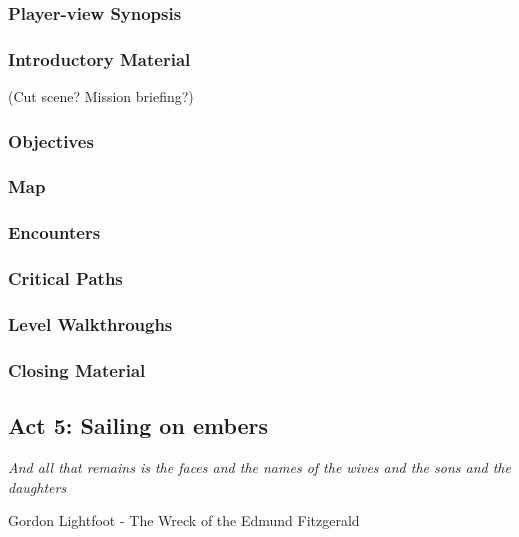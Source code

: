 \subsubsection{Player-view Synopsis}
\subsubsection{Introductory Material}
 (Cut scene?  Mission briefing?)
\subsubsection{Objectives}
\subsubsection{Map}
\subsubsection{Encounters}
\subsubsection{Critical Paths}
\subsubsection{Level Walkthroughs}
\subsubsection{Closing Material}

\subsection{Act 5: Sailing on embers}
\begin{center}
{\it And all that remains is the faces and the names of the wives and the sons and the daughters}
	
Gordon Lightfoot - The Wreck of the Edmund Fitzgerald
\end{center}
